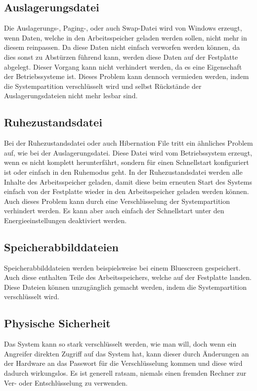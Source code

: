 \documentclass[12pt,a4paper]{scrreprt}
\begin{document}
\subsection{Auslagerungsdatei}
Die Auslagerungs-, Paging-, oder auch Swap-Datei wird von Windows erzeugt, wenn Daten, welche in den Arbeitsspeicher geladen werden sollen, nicht mehr in diesem reinpassen. Da diese Daten nicht einfach verworfen werden können, da dies sonst zu Abstürzen führend kann, werden diese Daten auf der Festplatte abgelegt. Dieser Vorgang kann nicht verhindert werden, da es eine Eigenschaft der Betriebssysteme ist. Dieses Problem kann dennoch vermieden werden, indem die Systempartition verschlüsselt wird und selbst Rückstände der Auslagerungsdateien nicht mehr lesbar sind.

\subsection{Ruhezustandsdatei}
Bei der Ruhezustandsdatei oder auch Hibernation File tritt ein ähnliches Problem auf, wie bei der Auslagerungsdatei. Diese Datei wird vom Betriebssystem erzeugt, wenn es nicht komplett herunterfährt, sondern für einen Schnellstart konfiguriert ist oder einfach in den Ruhemodus geht. In der Ruhezustandsdatei werden alle Inhalte des Arbeitsspeicher geladen, damit diese beim erneuten Start des Systems einfach von der Festplatte wieder in den Arbeitsspeicher geladen werden können. Auch dieses Problem kann durch eine Verschlüsselung der Systempartition verhindert werden. Es kann aber auch einfach der Schnellstart unter den Energieeinstellungen deaktiviert werden.

\subsection{Speicherabbilddateien}
Speicherabbilddateien werden beispielsweise bei einem Bluescreen gespeichert. Auch diese enthalten Teile des Arbeitsspeichers, welche auf der Festplatte landen. Diese Dateien können unzugänglich gemacht werden, indem die Systempartition verschlüsselt wird.

\subsection{Physische Sicherheit}
Das System kann so stark verschlüsselt werden, wie man will, doch wenn ein Angreifer direkten Zugriff auf das System hat, kann dieser durch Änderungen an der Hardware an das Passwort für die Verschlüsselung kommen und diese wird dadurch wirkungslos. Es ist generell ratsam, niemals einen fremden Rechner zur Ver- oder Entschlüsselung zu verwenden.
\end{document}
